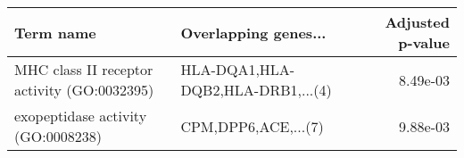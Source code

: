 \begin{tabular}{llr}
\toprule
                                  Term name &              Overlapping genes... &  Adjusted p-value \\
\midrule
MHC class II receptor activity (GO:0032395) & HLA-DQA1,HLA-DQB2,HLA-DRB1,...(4) &          8.49e-03 \\
         exopeptidase activity (GO:0008238) &               CPM,DPP6,ACE,...(7) &          9.88e-03 \\
\bottomrule
\end{tabular}
